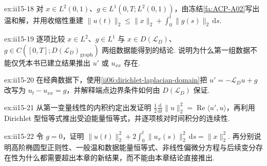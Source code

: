 \begin{FAExercise}{ex:ii15-18}
对 \(\displaystyle x\in L^2(0,1)\)、\(\displaystyle g\in L^1(0,T;L^2(0,1))\)，由冻结\autoref{fa:ACP-A02}写出温和解，并用收缩性重建 \(\displaystyle\|u(t)\|_2\leqslant\|x\|_2+\int_0^t\|g(s)\|_2\,\mathrm{d}s\).
\end{FAExercise}

\begin{FAExercise}[温和与经典的区分]{ex:ii15-19}
逐项比较 \(\displaystyle x\in L^2\)、\(\displaystyle g\in L^1\) 与 \(\displaystyle x\in D(\mathcal L_D)\)、\(\displaystyle g\in C([0,T];D(\mathcal L_D)_{\mathrm{graph}})\) 两组数据能得到的结论. 说明为什么第一组数据不能仅凭本书已建立结果推出 \(\displaystyle u'\) 或 \(\displaystyle u_{xx}\) 存在.
\end{FAExercise}

\begin{FAExercise}[经典热偏微分方程识别]{ex:ii15-20}
在经典数据下，使用\autoref{ii06:dirichlet-laplacian-domain}把 \(\displaystyle u'=-\mathcal L_Du+g\) 改写为 \(\displaystyle u_t-u_{xx}=g\)，并解释端点边界条件如何由 \(\displaystyle D(\mathcal L_D)\) 保证.
\end{FAExercise}

\begin{FAExercise}[热能量恒等式]{ex:ii15-21}
从第一变量线性的内积约定出发证明 \(\displaystyle\frac12\frac{\mathrm{d}}{\mathrm{d}t}\|u\|_2^2=\operatorname{Re}\langle u',u\rangle\)，再利用 Dirichlet 型恒等式推出受迫能量恒等式，并逐项核对时间积分的连续性.
\end{FAExercise}

\begin{FAExercise}[齐次耗散与后续边界]{ex:ii15-22}
令 \(\displaystyle g=0\)，证明 \(\displaystyle\|u(t)\|_2^2+2\int_0^t\|u_x(s)\|_2^2\,\mathrm{d}s=\|x\|_2^2\). 再分别说明高阶椭圆型正则性、一般温和数据能量恒等式、非线性偏微分方程与后续变分存在性为什么都需要超出本章的新结果，而不能由本章结论直接推出.
\end{FAExercise}
